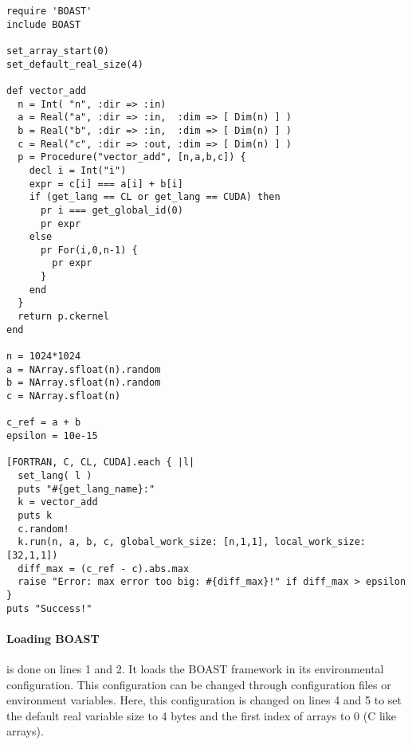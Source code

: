 \lstset{style=BOAST}
\begin{lstlisting}
require 'BOAST'
include BOAST

set_array_start(0)
set_default_real_size(4)

def vector_add
  n = Int( "n", :dir => :in)
  a = Real("a", :dir => :in,  :dim => [ Dim(n) ] )
  b = Real("b", :dir => :in,  :dim => [ Dim(n) ] )
  c = Real("c", :dir => :out, :dim => [ Dim(n) ] )
  p = Procedure("vector_add", [n,a,b,c]) {
    decl i = Int("i")
    expr = c[i] === a[i] + b[i]
    if (get_lang == CL or get_lang == CUDA) then
      pr i === get_global_id(0)
      pr expr
    else
      pr For(i,0,n-1) {
        pr expr
      }
    end
  }
  return p.ckernel
end

n = 1024*1024
a = NArray.sfloat(n).random
b = NArray.sfloat(n).random
c = NArray.sfloat(n)

c_ref = a + b
epsilon = 10e-15

[FORTRAN, C, CL, CUDA].each { |l|
  set_lang( l )
  puts "#{get_lang_name}:"
  k = vector_add
  puts k
  c.random!
  k.run(n, a, b, c, global_work_size: [n,1,1], local_work_size: [32,1,1])
  diff_max = (c_ref - c).abs.max
  raise "Error: max error too big: #{diff_max}!" if diff_max > epsilon
}
puts "Success!"
\end{lstlisting}

\paragraph{Loading BOAST} is done on lines 1 and 2.
It loads the BOAST framework in its environmental configuration.
This configuration can be changed through configuration files or environment variables.
Here, this configuration is changed on lines 4 and 5 to set the default real variable size to 4 bytes and the first index of arrays to 0 (C like arrays).

